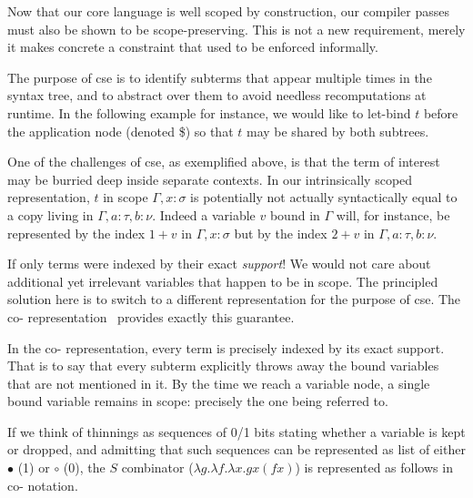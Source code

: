 

Now that our core language is well scoped by construction, our compiler passes
must also be shown to be scope-preserving.
%
This is not a new requirement, merely it makes concrete a constraint that
used to be enforced informally.


The purpose of \ac{cse} is to identify subterms that appear multiple times in the syntax tree, and to abstract over them to avoid needless recomputations at runtime.
%
In the following example for instance, we would like to let-bind $t$ before
the application node (denoted \$) so that $t$ may be shared by both subtrees.

\begin{center}
  \cseexamplegraph{}
\end{center}

One of the challenges of \ac{cse}, as exemplified above, is that the term of interest
may be burried deep inside separate contexts.
%
In our intrinsically scoped representation, $t$ in scope $\Gamma, x : \sigma$ is potentially not actually syntactically equal to a copy living in $\Gamma, a : \tau, b : \nu$.
%
Indeed a variable $v$ bound in $\Gamma$ will, for instance, be represented by
the \DeBruijn{} index $1+v$ in $\Gamma, x : \sigma$
but by the index $2+v$ in $\Gamma, a :  \tau, b : \nu$.

If only terms were indexed by their exact \emph{support}!
We would not care about additional yet irrelevant variables that happen to be in scope.
%
The principled solution here is to switch to a different representation for
the purpose of \ac{cse}.
The co-\DeBruijn{} representation~\cite{DBLP:journals/corr/abs-1807-04085} provides exactly this guarantee.


In the co-\DeBruijn{} representation, every term is precisely indexed by its
exact support.
%
That is to say that every subterm explicitly throws away the bound variables
that are not mentioned in it.
%
By the time we reach a variable node, a single bound variable remains in scope:
precisely the one being referred to.

If we think of thinnings as sequences of 0/1 bits stating whether a variable
is kept or dropped, and admitting that such sequences can be represented as
list of either $\bullet$ (1) or $\circ$ (0), the $S$ combinator
($\lambda g. \lambda f. \lambda x. g x (f x)$) is represented as follows in
co-\DeBruijn{} notation.

